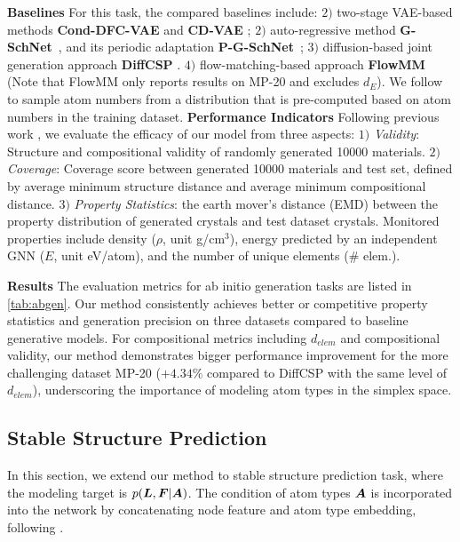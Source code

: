 \textbf{Baselines} For this task, the compared baselines include:  $2)$ two-stage VAE-based methods \textbf{Cond-DFC-VAE} \citep{court20203} and \textbf{CD-VAE} \citep{xie2021crystal}; $2)$ auto-regressive method \textbf{G-SchNet}~\citep{NIPS2019_8974}, and its periodic adaptation \textbf{P-G-SchNet}~\citep{xie2021crystal}; $3)$ diffusion-based joint generation approach \textbf{DiffCSP} \citep{jiao2023crystal}. $4)$ flow-matching-based approach \textbf{FlowMM} (Note that FlowMM only reports results on MP-20 and excludes $d_{E}$). We follow \citep{hoogeboom2022equivariant,jiao2023crystal} to sample atom numbers from a distribution that is pre-computed based on atom numbers in the training dataset. \textbf{Performance Indicators} Following previous work \citep{xie2021crystal}, we evaluate the efficacy of our model from three aspects: $1)$ \textit{Validity}: Structure and compositional validity of randomly generated 10000 materials. $2)$ \textit{Coverage}: Coverage score between generated 10000 materials and test set, defined by average minimum structure distance and average minimum compositional distance. $3)$ \textit{Property Statistics}: the earth mover's distance (EMD) between the property distribution of generated crystals and test dataset crystals. Monitored properties include density ($\rho$, unit g/cm$^3$), energy predicted by an independent GNN ($E$, unit eV/atom), and the number of unique elements (\# elem.).

\textbf{Results} The evaluation metrics for ab initio generation tasks are listed in \cref{tab:abgen}. Our method consistently achieves better or competitive property statistics and generation precision on three datasets compared to baseline generative models. For compositional metrics including $d_{elem}$ and compositional validity, our method demonstrates bigger performance improvement for the more challenging dataset MP-20 ($+4.34$\% compared to DiffCSP with the same level of $d_{elem}$), underscoring the importance of modeling atom types in the simplex space. 

\subsection{Stable Structure Prediction} \label{sec:exp_csp}
In this section, we extend our method to stable structure prediction task, where the modeling target is $p({\bm{L}},{\bm{F}}|{\bm{A}})$. The condition of atom types ${\bm{A}}$ is incorporated into the network by concatenating node feature and atom type embedding, following \citet{jiao2023crystal}. 

